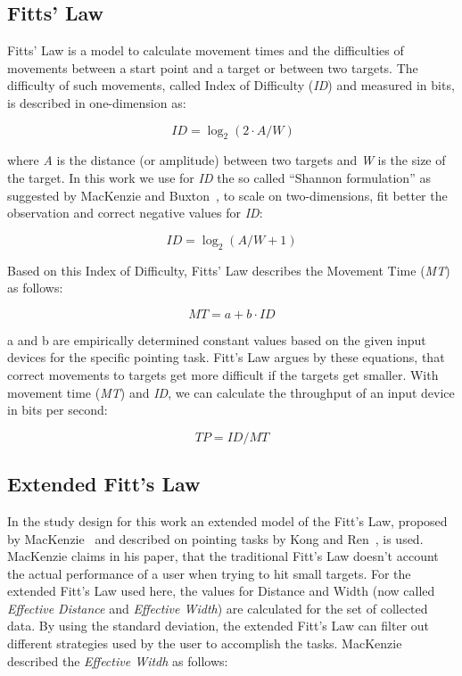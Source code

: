 \subsection{Fitts' Law}
\label{subsec:related-work:background:fitts_law}

Fitts' Law is a model to calculate movement times and the difficulties of movements between a start point and a target or between two targets. The difficulty of such movements, called Index of Difficulty (\textit{ID}) and measured in bits, is described in one-dimension as:

\[\ ID = \log_2 (2 \cdot A / W) \]

where \textit{A} is the distance (or amplitude) between two targets and \textit{W} is the size of the target. In this work we use for \textit{ID} the so called ``Shannon formulation'' as suggested by MacKenzie and Buxton~\cite{mackenzie_extending_1992}, to scale on two-dimensions, fit better the observation and correct negative values for \textit{ID}:

\[ ID = \log_2 (A / W + 1) \]

\newpage

 Based on this Index of Difficulty, Fitts' Law describes the Movement Time (\textit{MT}) as follows:

\[ MT = a + b \cdot ID\]

a and b are empirically determined constant values based on the given input devices for the specific pointing task. Fitt's Law argues by these equations, that correct movements to targets get more difficult if the targets get smaller. With movement time (\textit{MT}) and \textit{ID}, we can calculate the throughput of an input device in bits per second:

\[ TP = ID / MT \]

\subsection{Extended Fitt's Law}
\label{subsec:related-work:background:extended_fitts_law}

In the study design for this work an extended model of the Fitt's Law, proposed by MacKenzie~\cite{mackenzie_fitts_law_reasearch_tool} and described on pointing tasks by Kong and Ren~\cite{kong_calculation_2006}, is used. MacKenzie claims in his paper, that the traditional Fitt's Law doesn't account the actual performance of a user when trying to hit small targets. For the extended
Fitt's Law used here, the values for Distance and Width (now called \textit{Effective Distance} and \textit{Effective Width}) are calculated for the set of collected data. By using the standard deviation, the extended Fitt's Law can filter out different strategies used by the user to accomplish the tasks. MacKenzie described the \textit{Effective Witdh} as follows:

